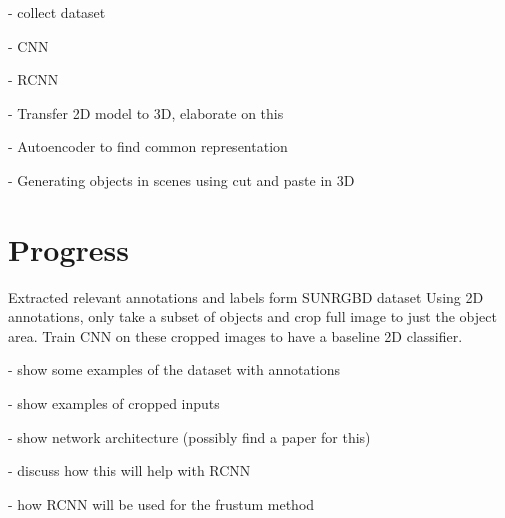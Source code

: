 \documentclass[11pt]{article}
\begin{document}
- collect dataset

- CNN

- RCNN

- Transfer 2D model to 3D, elaborate on this

- Autoencoder to find common representation

- Generating objects in scenes using cut and paste in 3D

\section{Progress}

Extracted relevant annotations and labels form SUNRGBD dataset
Using 2D annotations, only take a subset of objects and crop full image to just the object area.
Train CNN on these cropped images to have a baseline 2D classifier.

- show some examples of the dataset with annotations

- show examples of cropped inputs

- show network architecture (possibly find a paper for this)

- discuss how this will help with RCNN

- how RCNN will be used for the frustum method





\end{document}
